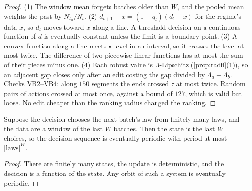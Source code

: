 \documentclass[11pt]{article}
\theoremstyle{definition}\newtheorem{definition}[theorem]{Definition}\newtheorem{remark}[theorem]{Remark}\newtheorem{example}[theorem]{Example}\newtheorem{problem}[theorem]{Open problem}\crefname{problem}{Problem}{Problems}
\begin{document}
\begin{proof}
(1) The window mean forgets batches older than $W$, and the pooled mean weights the past by $N_{t_0}/N_t$. (2) $d_{t+1}-x=(1-q_t)(d_t-x)$ for the regime's data $x$, so $d_t$ moves toward $x$ along a line. A threshold decision on a continuous function of $d$ is eventually constant unless the limit is a boundary point. (3) A convex function along a line meets a level in an interval, so it crosses the level at most twice. The difference of two piecewise-linear functions has at most the sum of their pieces minus one. (4) Each robust value is $\Lambda$-Lipschitz (\cref{prop:radii}(1)), so an adjacent gap closes only after an edit costing the gap divided by $\Lambda_a+\Lambda_b$. Checks VB2--VB4: along $150$ segments the ends crossed $\tau$ at most twice. Random pairs of actions crossed at most once, against a bound of $127$, which is valid but loose. No edit cheaper than the ranking radius changed the ranking.
\end{proof}

\begin{proposition}\label{prop:closedloop}
Suppose the decision chooses the next batch's law from finitely many laws, and the data are a window of the last $W$ batches. Then the state is the last $W$ choices, so the decision sequence is eventually periodic with period at most $|\text{laws}|^W$.
\end{proposition}

\begin{proof}
There are finitely many states, the update is deterministic, and the decision is a function of the state. Any orbit of such a system is eventually periodic.
\end{proof}
\end{document}
